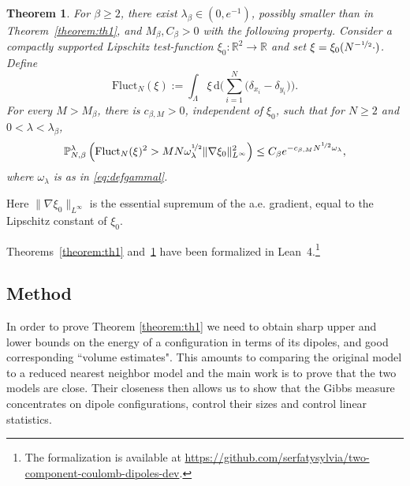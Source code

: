 \documentclass[a4paper,10pt,leqno]{amsart}
\numberwithin{equation}{section}
\newtheorem{theo}{Theorem}
\newcommand{\R}{\mathbb{R}}
\newcommand{\dd}{\mathrm{d}}
\def\P{\mathbb{P}_{N,\beta}^{\lambda}}
\def\Fluct{\mathrm{Fluct}}
\begin{document}
\begin{theo}\label{prop:linear}
  For $\beta\ge2$, there exist $\lambda_\beta\in(0,e^{-1})$, possibly smaller than in Theorem~\ref{theorem:th1}, and $M_\beta,C_\beta>0$ with the following property. Consider a compactly supported Lipschitz test-function $\xi_0 :\R^2 \to \R$ and set $\xi=\xi_0(N^{-\nicefrac{1}{2}}\cdot)$. Define \[\Fluct_N(\xi):= \int_{\Lambda} \xi \, \dd \Big(\sum_{i=1}^N \bigl(\delta_{x_i}-\delta_{y_i}\bigr)\Big).\]
  For every $M>M_\beta$, there is $c_{\beta,M}>0$, independent of $\xi_0$, such that for $N\ge2$ and $0<\lambda<\lambda_\beta$,
  \begin{equation*}
    \P\left( \Fluct_N(\xi)^2 > M N \omega_\lambda^{\nicefrac{1}{2}}\Vert\nabla\xi_0\Vert_{L^{\infty}}^2 \right)\leq C_\beta e^{-c_{\beta,M} N^{\nicefrac{1}{2}}\omega_\lambda},
  \end{equation*}
  where $\omega_\lambda$ is as in \eqref{eq:defgammal}.
\end{theo}
Here $\|\nabla\xi_0\|_{L^\infty}$ is the essential supremum of the a.e. gradient, equal to the Lipschitz constant of $\xi_0$.

  {\hypersetup{linkcolor=blue}\renewcommand{\thefootnote}{{\arabic{footnote}}}Theorems~\ref{theorem:th1} and~\ref{prop:linear} have been formalized in Lean~4.\footnote{{The formalization is available at \hypersetup{urlcolor=blue}\url{https://github.com/serfatysylvia/two-component-coulomb-dipoles-dev}.}}}

\subsection{Method}
In order to prove Theorem \ref{theorem:th1}
we need to obtain sharp upper and lower bounds on the energy of a configuration in terms of its dipoles, and good corresponding ``volume estimates".
This amounts to comparing the original model to a reduced nearest neighbor model
and the main work is to prove that the two models are close. Their closeness then allows us to show that the Gibbs measure concentrates on dipole configurations, control their sizes and control linear statistics.
\end{document}
